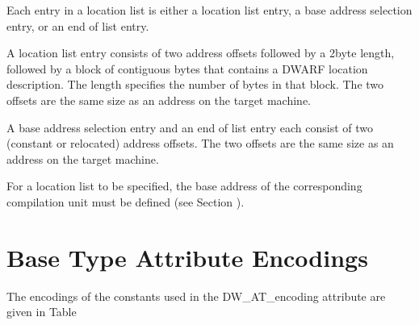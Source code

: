 Each entry in a location list is either a location list entry,
a base address selection entry, or an end of list entry.

A location list entry consists of two address offsets followed
by a 2\dash byte length, followed by a block of contiguous bytes
that contains a DWARF location description. The length
specifies the number of bytes in that block. The two offsets
are the same size as an address on the target machine.

A base address selection entry and an end of list entry each
consist of two (constant or relocated) address offsets. The two
offsets are the same size as an address on the target machine.

For a location list to be specified, the base address of
the corresponding compilation unit must be defined 
(see Section  ).

\section{Base Type Attribute Encodings}
\label{datarep:basetypeattributeencodings}

The encodings of the constants used in the DW\-\_AT\-\_encoding
attribute are given in 
Table 

